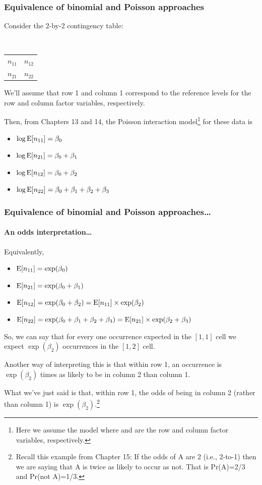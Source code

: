 \documentclass{beamer}\usepackage[]{graphicx}\usepackage[]{xcolor}
\begin{document}
\begin{frame}
\frametitle{Equivalence of binomial and Poisson approaches}
Consider the 2-by-2 contingency table:
\medskip

\begin{center}
{\tt \small 
\begin{tabular}{rr}
$n_{11}$ & $n_{12}$   \\
$n_{21}$ & $n_{22}$   \\ 
\end{tabular}}
\end{center}
\bigskip

We'll assume that row 1 and column 1 correspond to the reference levels for the row and column factor variables, respectively.
\medskip

Then, from Chapters 13 and 14, the Poisson interaction model\footnote{Here we assume the model  where  and  are the row and column factor variables, respectively.} for these data is
\medskip


\begin{itemize}
\item[] $\log \operatorname{E}[n_{11}] = \beta_0$ 
\item[] $\log \operatorname{E}[n_{21}] = \beta_0 + \beta_1$ 
\item[] $\log \operatorname{E}[n_{12}] = \beta_0 + \beta_2$ 
\item[] $\log \operatorname{E}[n_{22}] = \beta_0 + \beta_1 + \beta_2 + \beta_3$
\end{itemize}

\end{frame}



\begin{frame}
\frametitle{Equivalence of binomial and Poisson approaches\ldots}
\framesubtitle{An odds interpretation\ldots}
Equivalently,
\medskip

\begin{itemize}
\item[] $\operatorname{E}[n_{11}] = \exp(\beta_0)$
\item[] $\operatorname{E}[n_{21}] = \exp(\beta_0 + \beta_1)$
\item[] $\operatorname{E}[n_{12}] = \exp(\beta_0 + \beta_2) = \operatorname{E}[n_{11}] \times \exp(\beta_2)$
\item[] $\operatorname{E}[n_{22}] = \exp(\beta_0 + \beta_1 + \beta_2 + \beta_3) = \operatorname{E}[n_{21}] \times \exp(\beta_2 + \beta_3)$ 
\end{itemize}
\bigskip

So, we can say that for every one occurrence expected in the $[1,1]$ cell we expect $\exp(\beta_2)$  occurrences in the $[1,2]$ cell. 
\medskip

Another way of interpreting this is that within row 1, an occurrence is $\exp(\beta_2)$ times as likely to be in column 2 than column 1. 
\medskip

What we've just said is that, within row 1, the odds of being in column 2 (rather than column 1) is $\exp(\beta_2)$.\footnote{Recall this example from Chapter 15: If the odds of A are 2 (i.e., 2-to-1) then we are saying that A is twice as likely to occur as not. That is Pr(A)=2/3 and Pr(not A)=1/3.}
\end{frame}
\end{document}
